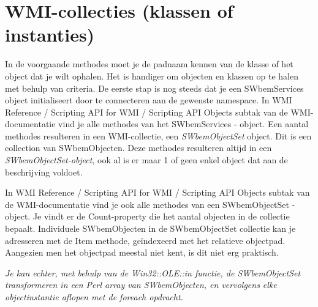 \documentclass[11pt,a4paper]{report}
\begin{document}
\section{WMI-collecties (klassen of instanties)}
In de voorgaande methodes moet je de padnaam kennen van de klasse of het object dat je wilt ophalen. Het is handiger om objecten en klassen op te halen met behulp van criteria. De eerste stap is nog steeds dat je een SWbemServices object initialiseert door te connecteren aan de gewenste namespace. In WMI Reference / Scripting API for WMI / Scripting API Objects subtak van de WMI-documentatie vind je alle methodes van het SWbemServices - object. Een aantal methodes resulteren in een WMI-collectie, een \textit{SWbemObjectSet} object. Dit is een collection van SWbemObjecten. Deze methodes resulteren altijd in een \textit{SWbemObjectSet-object}, ook al is er maar 1 of geen enkel object dat aan de beschrijving voldoet.
\par In WMI Reference / Scripting API for WMI / Scripting API Objects subtak van de WMI-documentatie vind je ook alle methodes van een SWbemObjectSet - object. Je vindt er de Count-property die het aantal objecten in de collectie bepaalt. Individuele SWbemObjecten in de SWbemObjectSet collectie kan je adresseren met de Item methode, geïndexeerd met het relatieve objectpad. Aangezien men het objectpad meestal niet kent, is dit niet erg praktisch.
\par \textit{Je kan echter, met behulp van de Win32::OLE::in functie, de SWbemObjectSet transformeren in een Perl array van SWbemObjecten, en vervolgens elke objectinstantie aflopen met de foreach opdracht.}
\end{document}
